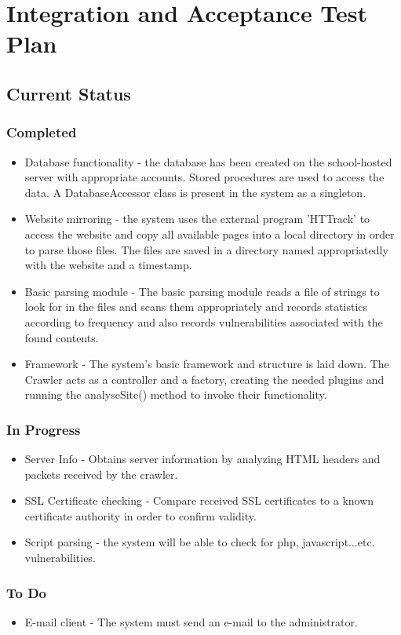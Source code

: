 \documentclass{article}
\begin{document}
\newpage
\section{Integration and Acceptance Test Plan}
\subsection{Current Status}
\subsubsection{Completed}
\begin{itemize}
	\item Database functionality - the database has been created on the school-hosted server with appropriate accounts.  Stored procedures are used to access the data.  A DatabaseAccessor class is present in the system as a singleton.
	\item Website mirroring - the system uses the external program 'HTTrack' to access the website and copy all available pages into a local directory in order to parse those files.  The files are saved in a directory named appropriatedly with the website and a timestamp.
	\item Basic parsing module - The basic parsing module reads a file of strings to look for in the files and scans them appropriately and records statistics according to frequency and also records vulnerabilities associated with the found contents.
	\item Framework - The system's basic framework and structure is laid down.  The Crawler acts as a controller and a factory, creating the needed plugins and running the analyseSite() method to invoke their functionality. 
\end{itemize}
\subsubsection{In Progress}
\begin{itemize}
	\item Server Info - Obtains server information by analyzing HTML headers and packets received by the crawler.
	\item SSL Certificate checking - Compare received SSL certificates to a known certificate authority in order to confirm validity.
	\item Script parsing - the system will be able to check for php, javascript...etc. vulnerabilities.
\end{itemize}
\subsubsection{To Do}
\begin{itemize}
	\item E-mail client - The system must send an e-mail to the administrator.
\end{itemize}
\end{document}
